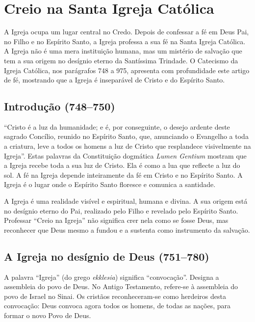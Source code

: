 \chapter{Creio na Santa Igreja Católica}

A Igreja ocupa um lugar central no Credo. Depois de confessar a fé em Deus Pai, no Filho e no Espírito Santo, a Igreja professa a sua fé na Santa Igreja Católica. A Igreja não é uma mera instituição humana, mas um mistério de salvação que tem a sua origem no desígnio eterno da Santíssima Trindade. O Catecismo da Igreja Católica, nos parágrafos 748 a 975, apresenta com profundidade este artigo de fé, mostrando que a Igreja é inseparável de Cristo e do Espírito Santo.

\section{Introdução (748--750)}

``Cristo é a luz da humanidade; e é, por conseguinte, o desejo ardente deste sagrado Concílio, reunido no Espírito Santo, que, anunciando o Evangelho a toda a criatura, leve a todos os homens a luz de Cristo que resplandece visivelmente na Igreja''. Estas palavras da Constituição dogmática \emph{Lumen Gentium} mostram que a Igreja recebe toda a sua luz de Cristo. Ela é como a lua que reflecte a luz do sol. A fé na Igreja depende inteiramente da fé em Cristo e no Espírito Santo. A Igreja é o lugar onde o Espírito Santo floresce e comunica a santidade.

A Igreja é uma realidade visível e espiritual, humana e divina. A sua origem está no desígnio eterno do Pai, realizado pelo Filho e revelado pelo Espírito Santo. Professar ``Creio na Igreja'' não significa crer nela como se fosse Deus, mas reconhecer que Deus mesmo a fundou e a sustenta como instrumento da salvação.

\section{A Igreja no desígnio de Deus (751--780)}

A palavra ``Igreja'' (do grego \emph{ekklesia}) significa ``convocação''. Designa a assembleia do povo de Deus. No Antigo Testamento, refere-se à assembleia do povo de Israel no Sinai. Os cristãos reconheceram-se como herdeiros desta convocação: Deus convoca agora todos os homens, de todas as nações, para formar o novo Povo de Deus.

